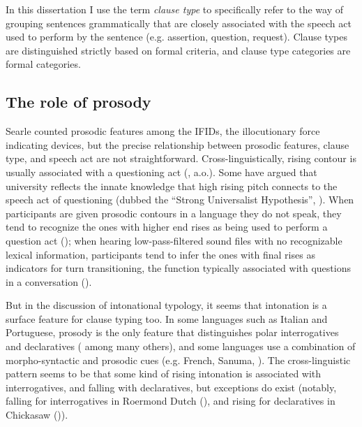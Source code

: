 In this dissertation I use the term \emph{clause type} to specifically refer to the way of grouping sentences grammatically that are closely associated with the speech act used to perform by the sentence (e.g. assertion, question, request). Clause types are distinguished strictly based on formal criteria, and clause type categories are formal categories. 

\subsection{The role of prosody}
\label{sec:bg:theory:prosody}

Searle counted prosodic features among the IFIDs, the illocutionary force indicating devices, but the
precise relationship between prosodic features, clause type, and speech act are not straightforward. Cross-linguistically, rising contour is usually associated with a questioning act (\citealt{bolinger1978, ladd1981, gussenhovenchen2000, ladd2001typology}, a.o.). Some have argued that university reflects the innate knowledge that high rising pitch connects to the speech act of questioning (dubbed the ``Strong Universalist Hypothesis'', \cite{ladd1981}). When participants are given prosodic contours in a language they do not speak, they tend to recognize the ones with higher end rises as being used to perform a question act (\cite{gussenhovenchen2000}); when hearing low-pass-filtered sound files with no recognizable lexical information, participants tend to infer the ones with final rises as indicators for turn transitioning, the function typically associated with questions in a conversation (\cite{bogels2015prosodyturn}). 

But in the discussion of intonational typology, it seems that intonation is a surface feature for clause typing too. In some languages such as Italian and Portuguese, prosody is the only feature that distinguishes polar interrogatives and declaratives (\citealt{konig2007, truckenbrodt2009prosody} among many others), and some languages use a combination of morpho-syntactic and prosodic cues (e.g. French, Sanuma, \cite{konig2007, aikhenvald2016}). The cross-linguistic pattern seems to be that some kind of rising intonation is associated with interrogatives, and falling with declaratives, but exceptions do exist (notably, falling for interrogatives in Roermond Dutch (\cite{gussenhoven2002}), and rising for declaratives in Chickasaw (\cite{gordon1999prosody})). 




